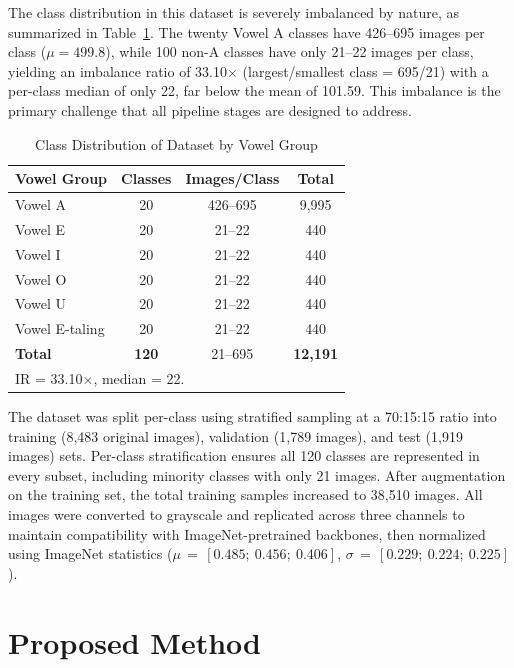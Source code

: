\documentclass[conference]{IEEEtran}
\begin{document}
The class distribution in this dataset is severely imbalanced by
nature, as summarized in Table~\ref{tab:dist}.
The twenty Vowel A classes have 426--695 images per class
($\mu = 499.8$), while 100 non-A classes have only 21--22 images
per class, yielding an imbalance ratio of 33.10$\times$
(largest/smallest class = 695/21) with a per-class median of only 22,
far below the mean of 101.59.
This imbalance is the primary challenge that all pipeline stages are
designed to address.

\begin{table}[t]
\caption{Class Distribution of Dataset by Vowel Group}
\label{tab:dist}
\begin{center}
\renewcommand{\arraystretch}{1.2}
\begin{tabular}{lccc}
\toprule
\textbf{Vowel Group} & \textbf{Classes} &
  \textbf{Images/Class} & \textbf{Total} \\
\midrule
Vowel A        & 20 & 426--695 & 9,995 \\
Vowel E        & 20 & 21--22   &   440 \\
Vowel I        & 20 & 21--22   &   440 \\
Vowel O        & 20 & 21--22   &   440 \\
Vowel U        & 20 & 21--22   &   440 \\
Vowel E-taling & 20 & 21--22   &   440 \\
\midrule
\textbf{Total} & \textbf{120} & 21--695 & \textbf{12,191} \\
\bottomrule
\multicolumn{4}{l}{\footnotesize IR = 33.10$\times$, median = 22.}
\end{tabular}
\end{center}
\end{table}

The dataset was split per-class using stratified sampling at a
70:15:15 ratio into training (8,483 original images), validation
(1,789 images), and test (1,919 images) sets.
Per-class stratification ensures all 120 classes are represented
in every subset, including minority classes with only 21 images.
After augmentation on the training set, the total training samples
increased to 38,510 images.
All images were converted to grayscale and replicated across three
channels to maintain compatibility with ImageNet-pretrained backbones,
then normalized using ImageNet statistics
($\mu\,{=}\,[0.485;\ 0.456;\ 0.406]$,
$\sigma\,{=}\,[0.229;\ 0.224;\ 0.225]$).

\section{Proposed Method}
\label{sec:method}
\end{document}
